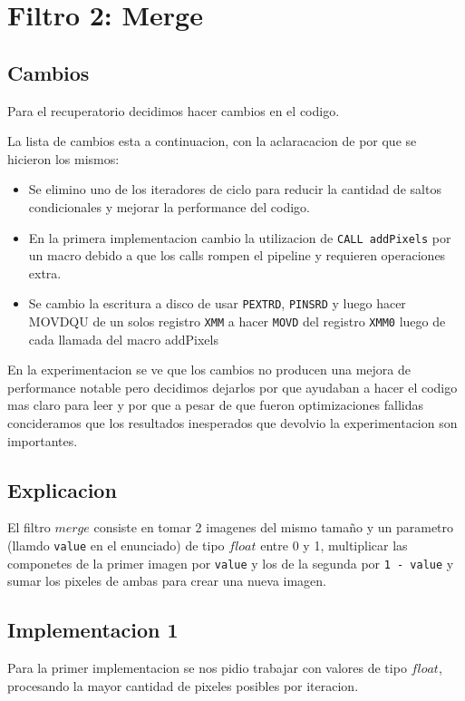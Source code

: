 \section{Filtro 2: Merge}

\subsection{Cambios}
Para el recuperatorio decidimos hacer cambios en el codigo.

La lista de cambios esta a continuacion, con la aclaracacion de por que se hicieron los mismos:
\noindent
\begin{itemize}
\item Se elimino uno de los iteradores de ciclo para reducir la cantidad de saltos condicionales y mejorar la performance del codigo.
\item En la primera implementacion cambio la utilizacion de \texttt{CALL addPixels} por un macro debido a que los calls rompen el pipeline y requieren operaciones extra.
\item Se cambio la escritura a disco de usar \texttt{PEXTRD}, \texttt{PINSRD} y luego hacer MOVDQU de un solos registro \texttt{XMM} a hacer \texttt{MOVD} del registro \texttt{XMM0} luego de cada llamada del macro addPixels
\end{itemize}

En la experimentacion se ve que los cambios no producen una mejora de performance notable pero decidimos dejarlos por que ayudaban a hacer el codigo mas claro para leer y por que a pesar de que fueron optimizaciones fallidas concideramos que los resultados inesperados que devolvio la experimentacion son importantes.

\subsection{Explicacion}
El filtro $merge$ consiste en tomar 2 imagenes del mismo tamaño y un parametro (llamdo \texttt{value} en el enunciado) de tipo $float$ entre 0 y 1, multiplicar las componetes de la primer imagen por \texttt{value} y los de la segunda por \texttt{1 - value} y sumar los pixeles de ambas para crear una nueva imagen. \\

\subsection{Implementacion 1}
Para la primer implementacion se nos pidio trabajar con valores de tipo $float$, procesando la mayor cantidad de pixeles posibles por iteracion. \\

